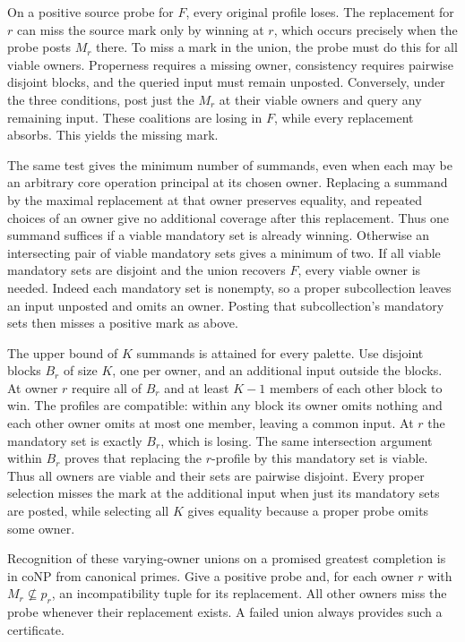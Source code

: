 On a positive source probe for $F$, every original profile
loses. The replacement for $r$ can miss the source mark
only by winning at $r$, which occurs precisely when the
probe posts $M_r$ there. To miss a mark in the union, the
probe must do this for all viable owners. Properness requires
a missing owner, consistency requires pairwise disjoint
blocks, and the queried input must remain unposted.
Conversely, under the three conditions, post just the
$M_r$ at their viable owners and query any remaining input.
These coalitions are losing in $F$, while every replacement
absorbs. This yields the missing mark.

The same test gives the minimum number of summands, even
when each may be an arbitrary core operation principal at
its chosen owner. Replacing a summand by the maximal
replacement at that owner preserves equality, and repeated
choices of an owner give no additional coverage after this
replacement. Thus one summand suffices if a viable mandatory
set is already winning. Otherwise an intersecting pair of
viable mandatory sets gives a minimum of two. If all viable
mandatory sets are disjoint and the union recovers $F$, every
viable owner is needed. Indeed each mandatory set is nonempty,
so a proper subcollection leaves an input unposted and omits
an owner. Posting that subcollection's mandatory sets then
misses a positive mark as above.

The upper bound of $K$ summands is attained for every palette.
Use disjoint blocks $B_r$ of size $K$, one per owner, and an
additional input outside the blocks. At owner $r$ require
all of $B_r$ and at least $K-1$ members of each other block
to win. The profiles are compatible: within any block its
owner omits nothing and each other owner omits at most one
member, leaving a common input. At $r$ the mandatory set
is exactly $B_r$, which is losing. The same intersection
argument within $B_r$ proves that replacing the $r$-profile
by this mandatory set is viable. Thus all owners are viable
and their sets are pairwise disjoint. Every proper selection
misses the mark at the additional input when just its
mandatory sets are posted, while selecting all $K$ gives
equality because a proper probe omits some owner.

Recognition of these varying-owner unions on a promised greatest
completion is in coNP from canonical primes. Give a positive
probe and, for each owner $r$ with $M_r\nsubseteq p_r$, an
incompatibility tuple for its replacement. All other owners
miss the probe whenever their replacement exists. A failed
union always provides such a certificate.

